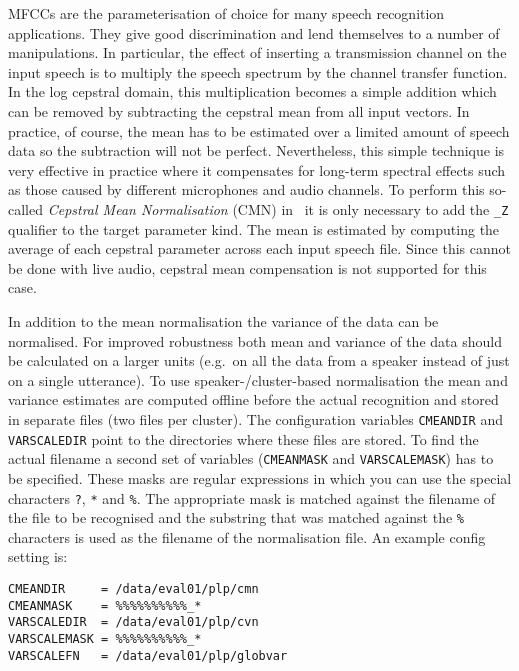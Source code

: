 MFCCs are the parameterisation of choice for many speech recognition applications.
They give good discrimination and lend themselves to a number of manipulations.
In particular, the effect of inserting a transmission channel on the input
speech is to multiply the speech spectrum by the channel transfer function.
In the log cepstral domain, this multiplication becomes a simple addition which
can be removed by subtracting the cepstral mean from all input vectors.
In practice, of course, the mean has to be estimated over a limited amount
of speech data so the subtraction will not be perfect.  Nevertheless, this
simple technique is very effective in practice where it
compensates for long-term spectral effects such as those caused by different
microphones and audio channels.  To perform this
so-called \textit{Cepstral Mean Normalisation} (CMN) in \HTK\, it is only necessary
to add the \texttt{\_Z} qualifier to the 
target parameter kind.  The mean is estimated by computing the average of
each cepstral parameter across each input speech file.  Since this cannot be done
with live audio, cepstral mean compensation is not supported for this case.

In addition to the mean normalisation the variance of the data can be
normalised. For improved robustness both mean and variance of the data
should be calculated on a larger units (e.g.\ on all the data from a
speaker instead of just on a single utterance). To use
speaker-/cluster-based normalisation the mean and variance estimates
are computed offline before the actual recognition and stored in
separate files (two files per cluster). The configuration variables
\texttt{CMEANDIR} and
\texttt{VARSCALEDIR} point to the
directories where these files are stored. To find the actual filename
a second set of variables
(\texttt{CMEANMASK} and
\texttt{VARSCALEMASK}) has to be
specified. These masks are regular expressions in which you can use
the special characters \texttt{?}, \texttt{*} and \texttt{\%}. The
appropriate mask is matched against the filename of the file to be
recognised and the substring that was matched against the \texttt{\%}
characters is used as the filename of the normalisation file. An
example config setting is:

\begin{verbatim}
CMEANDIR     = /data/eval01/plp/cmn
CMEANMASK    = %%%%%%%%%%_*
VARSCALEDIR  = /data/eval01/plp/cvn
VARSCALEMASK = %%%%%%%%%%_*
VARSCALEFN   = /data/eval01/plp/globvar
\end{verbatim}

